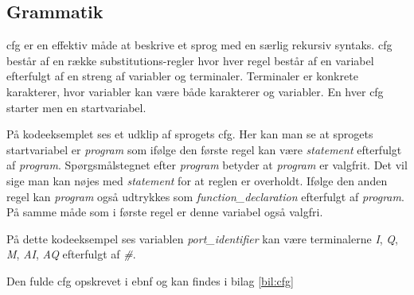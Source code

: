 \subsection{Grammatik}\label{sec:Gramatik}
\noindent \gls{cfg} er en effektiv måde at beskrive et sprog med en særlig rekursiv syntaks. \gls{cfg} består af en række substitutions-regler hvor hver regel består af en variabel efterfulgt af en streng af variabler og terminaler. Terminaler er konkrete karakterer, hvor variabler kan være både karakterer og variabler. En hver \gls{cfg} starter men en startvariabel.

På kodeeksemplet ses et udklip af sprogets \gls{cfg}. Her kan man se at sprogets startvariabel er \textit{program} som ifølge den første regel kan være \textit{statement} efterfulgt af \textit{program}. Spørgsmålstegnet efter \textit{program} betyder at \textit{program} er valgfrit. Det vil sige man kan nøjes med \textit{statement} for at reglen er overholdt. Ifølge den anden regel kan \textit{program} også udtrykkes som \textit{function\_declaration} efterfulgt af \textit{program}. På samme måde som i første regel er denne variabel også valgfri.


\noindent På dette kodeeksempel ses variablen \textit{port\_identifier} kan være terminalerne \textit{I}, \textit{Q}, \textit{M}, \textit{AI}, \textit{AQ} efterfulgt af \textit{\#}.

\noindent Den fulde \gls{cfg} opskrevet i \gls{ebnf} og kan findes i bilag \ref{bil:cfg}